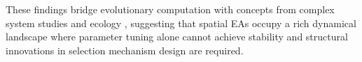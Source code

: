 \documentclass[dvipsnames,format=sigconf,anonymous=false,review=false]{acmart}
\begin{document}
These findings bridge evolutionary computation with concepts from complex system studies and ecology , suggesting that spatial EAs occupy a rich dynamical landscape where parameter tuning alone cannot achieve stability and structural innovations in selection mechanism design are required.


\newpage




\end{document}

